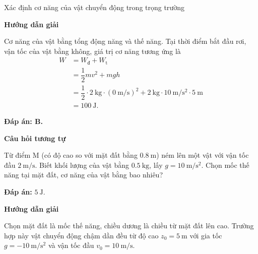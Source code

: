 \begin{dang}{Xác định cơ năng của vật chuyển động trong trọng trường}
	{	\begin{center}
			\textbf{Hướng dẫn giải}
		\end{center}
		Cơ năng của vật bằng tổng động năng và thế năng. Tại thời điểm bắt đầu rơi, vận tốc của vật bằng không, giá trị cơ năng tương ứng là 
		\begin{align*}
			W&=W_\text{đ}+W_\text{t}\\
			&=\dfrac{1}{2}mv^2+mgh\\
			&=\dfrac{1}{2}\cdot\SI{2}{\kilogram}\cdot(\SI{0}{\meter/\second})^2+\SI{2}{\kilogram}\cdot\SI{10}{\meter/\second^2}\cdot\SI{5}{\meter}\\
			&=\SI{100}{\joule}.
		\end{align*}
		
		\textbf{Đáp án: B.}
		
		\begin{center}
			\textbf{Câu hỏi tương tự}
		\end{center}
		
		Từ điểm M (có độ cao so với mặt đất bằng $\SI{0,8}{\meter}$) ném lên một vật với vận tốc đầu $\SI{2}{\meter/\second}$. Biết khối lượng của vật bằng $\SI{0,5}{\kilogram}$, lấy $g=\SI{10}{\meter/\second^2}$. Chọn mốc thế năng tại mặt đất, cơ năng của vật bằng bao nhiêu?
		
		\textbf{Đáp án:} $\SI{5}{\joule}$.
	}
	{	\begin{center}
			\textbf{Hướng dẫn giải}
		\end{center}
		
		Chọn mặt đất là mốc thế năng, chiều dương là chiều từ mặt đất lên cao. Trường hợp này vật chuyển động chậm dần đều từ độ cao $z_0=\SI{5}{\meter}$ với gia tốc $g=\SI{-10}{\meter/\second^2}$ và vận tốc đầu $v_0=\SI{10}{\meter/\second}$.
		
}
\end{dang}
